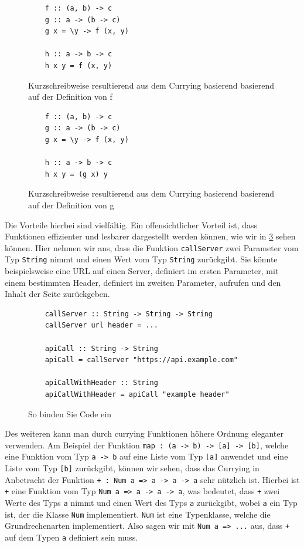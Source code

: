 \documentclass{hhuarticle}
\theoremstyle{definition}
\theoremstyle{theorem}
\begin{document}
  \begin{figure}[h]
    \begin{lstlisting}
    f :: (a, b) -> c
    g :: a -> (b -> c)
    g x = \y -> f (x, y)

    h :: a -> b -> c
    h x y = f (x, y)
    \end{lstlisting}
    \caption{Kurzschreibweise resultierend aus dem Currying basierend basierend auf der Definition von f}%
    \label{fig:curryingf}
  \end{figure}

  \begin{figure}[h]
    \begin{lstlisting}
    f :: (a, b) -> c
    g :: a -> (b -> c)
    g x = \y -> f (x, y)

    h :: a -> b -> c
    h x y = (g x) y
    \end{lstlisting}
    \caption{Kurzschreibweise resultierend aus dem Currying basierend basierend auf der Definition von g}%
    \label{fig:curryingg}
  \end{figure}

  Die Vorteile hierbei sind vielfältig. Ein offensichtlicher Vorteil ist,
  dass Funktionen effizienter und lesbarer dargestellt werden können,
  wie wir in \cref{fig:curryingExample} sehen können. Hier nehmen wir
  ans, dass die Funktion \verb|callServer| zwei Parameter vom Typ \verb|String| nimmt
  und einen Wert vom Typ \verb|String| zurückgibt. Sie könnte beispielsweise
  eine URL auf einen Server, definiert im ersten Parameter, mit
  einem bestimmten Header, definiert im zweiten Parameter, aufrufen und
  den Inhalt der Seite zurückgeben.

  \begin{figure}[h]

    \begin{lstlisting}
    callServer :: String -> String -> String
    callServer url header = ...

    apiCall :: String -> String
    apiCall = callServer "https://api.example.com"

    apiCallWithHeader :: String
    apiCallWithHeader = apiCall "example header"
    \end{lstlisting}
    \caption{So binden Sie Code ein}%
    \label{fig:curryingExample}
  \end{figure}

  Des weiteren kann man durch currying Funktionen höhere Ordnung
  eleganter verwenden. Am Beispiel der Funktion \verb|map : (a -> b) -> [a] -> [b]|,
  welche eine Funktion vom Typ \verb|a -> b| auf eine Liste vom Typ \verb|[a]| anwendet
  und eine Liste vom Typ \verb|[b]| zurückgibt, können wir sehen, dass
  das Currying in Anbetracht der Funktion \verb|+ : Num a => a -> a -> a| sehr nützlich ist.
  Hierbei ist \verb|+| eine Funktion vom Typ \verb|Num a => a -> a -> a|,
  was bedeutet, dass \verb|+| zwei Werte des Typs \verb|a| nimmt und einen Wert
  des Typs \verb|a| zurückgibt, wobei \verb|a| ein Typ ist, der die Klasse \verb|Num| implementiert.
  \verb|Num| ist eine Typenklasse, welche die Grundrechenarten implementiert.
  Also sagen wir mit \verb|Num a => ...| aus, dass \verb|+| auf dem
  Typen \verb|a| definiert sein muss.
\end{document}
